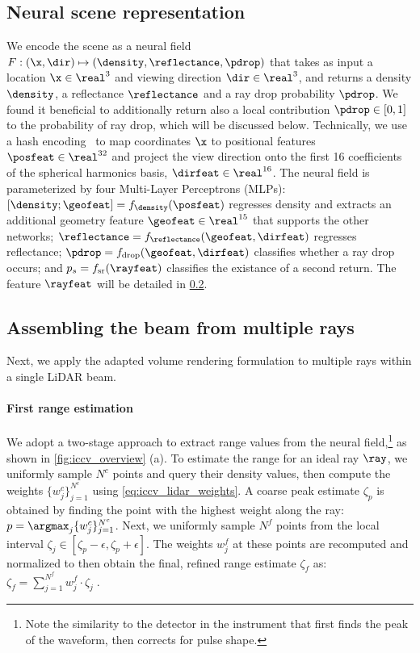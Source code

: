 \subsection{Neural scene representation}\label{sec:neural_scene_rep}
We encode the scene as a neural field $F: (\x, \dir) \mapsto (\density, \reflectance, \pdrop)$ that takes as input a location $\x \in \real^3$ and viewing direction $\dir \in \real^3$, and returns a density $\density$, a reflectance $\reflectance$ and a ray drop probability $\pdrop$. We found it beneficial to additionally return also a local contribution $\pdrop \in [0, 1]$ to the probability of ray drop, which will be discussed below.
Technically, we use a hash encoding~\cite{mueller2022instant} to map coordinates $\x$ to positional features $\posfeat \in \real^{32}$ and project the view direction onto the first 16 coefficients of the spherical harmonics basis, $\dirfeat \in \real^{16}$. The neural field is parameterized by four Multi-Layer Perceptrons (MLPs): $[\density; \geofeat] = f_\density(\posfeat)$ regresses density and extracts an additional geometry feature $\geofeat \in \real^{15}$ that supports the other networks; $\reflectance = f_{\reflectance}(\geofeat, \dirfeat)$ regresses reflectance; $\pdrop = f_{\text{drop}}(\geofeat, \dirfeat)$ classifies whether a ray drop occurs; and  $p_s = f_{\text{sr}}(\rayfeat)$ classifies the existance of a second return. The feature $\rayfeat$ will be detailed in \cref{sec:render_lidar}.





\subsection{Assembling the beam from multiple rays}
\label{sec:render_lidar}
Next, we apply the adapted volume rendering formulation to multiple rays within a single LiDAR beam.


\paragraph{First range estimation}
We adopt a two-stage approach to extract range values from the neural field,\footnote{Note the similarity to the detector in the instrument that first finds the peak of the waveform, then corrects for pulse shape.} as shown in \cref{fig:iccv_overview} (a).
To estimate the range for an ideal ray $\ray$, we uniformly sample $N^c$ points and query their density values, then compute the weights $\{w^c_j\}_{j=1}^{N^c}$ using \cref{eq:iccv_lidar_weights}. A coarse peak estimate $\zeta_p$ is obtained by finding the point with the highest weight along the ray: $p = \argmax_j \{w^c_j\}_{j=1}^{N^c} $. Next, we uniformly sample $N^f$ points from the local interval $\zeta_j \in [\zeta_p - \epsilon, \zeta_p + \epsilon]$. The weights $w_j^f$ at these points are recomputed and normalized to then obtain the final, refined range estimate $\zeta_f$ as:~$\zeta_f = \sum_{j=1}^{N^f} w^f_j \cdot \zeta_j\;.$



